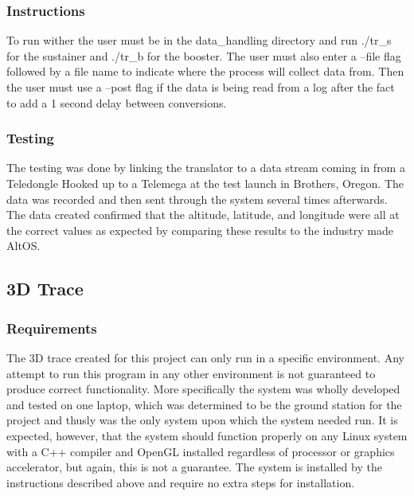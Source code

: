 \documentclass[onecolumn, draftclsnofoot,10pt, compsoc]{IEEEtran}
\begin{document}
\subsubsection{Instructions}
To run wither the user must be in the data\_handling directory and run ./tr\_s for the sustainer and ./tr\_b for the booster. The user must also enter a –file flag followed by a file name to indicate where the process will collect data from. Then the user must use a –post flag if the data is being read from a log after the fact to add a 1 second delay between conversions.
\subsubsection{Testing}
The testing was done by linking the translator to a data stream coming in from a Teledongle Hooked up to a Telemega at the test launch in Brothers, Oregon. The data was recorded and then sent through the system several times afterwards. The data created confirmed that the altitude, latitude, and longitude were all at the correct values as expected by comparing these results to the industry made AltOS.
\subsection{3D Trace}
\subsubsection{Requirements}
The 3D trace created for this project can only run in a specific environment. Any attempt to run this program in any other environment is not guaranteed to produce correct functionality. More specifically the system was wholly developed and tested on one laptop, which was determined to be the ground station for the project and thusly was the only system upon which the system needed run. It is expected, however, that the system should function properly on any Linux system with a C++ compiler and OpenGL installed regardless of processor or graphics accelerator, but again, this is not a guarantee. The system is installed by the instructions described above and require no extra steps for installation.
\end{document}
